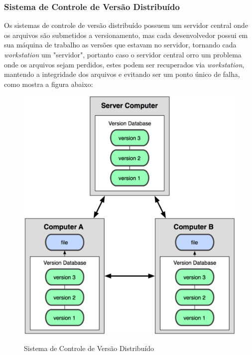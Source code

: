 \subsubsection{Sistema de Controle de Versão Distribuído}Os sistemas de controle de versão distribuído possuem um servidor central onde os arquivos são submetidos a versionamento, mas cada desenvolvedor possui em sua máquina de trabalho as versões que estavam no servidor, tornando cada \textit{workstation} um "servidor", portanto caso o servidor central orro um problema onde os arquivos sejam perdidos, estes podem ser recuperados via \textit{workstation}, mantendo a integridade dos arquivos e evitando ser um ponto único de falha, como mostra a figura abaixo:
\begin{figure}[tbh]
\centering
\caption[Sistema de Controle de Versão Distribuído]{Sistema de Controle de Versão Distribuído}
\includegraphics[width=0.7\linewidth]{./images/scvdist}
\label{fig:SCVDistribuido}
\end{figure}
